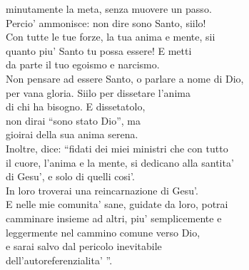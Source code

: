 \begin{haiku}
    minutamente la meta, senza muovere un passo.\\
    Percio' ammonisce: non dire sono Santo, siilo! \\
    Con tutte le tue forze, la tua anima e mente, sii \\
    quanto piu' Santo tu possa essere! E metti\\
    da parte il tuo egoismo e narcismo.\\
    Non pensare ad essere Santo, o parlare a nome di Dio,\\
    per vana gloria. Siilo per dissetare l'anima \\
    di chi ha bisogno. E dissetatolo, \\
    non dirai ``sono stato Dio'', ma \\
    gioirai della sua anima serena.\\
    Inoltre, dice: ``fidati dei miei ministri che con tutto\\
    il cuore, l'anima e la mente, si dedicano alla santita'\\
    di Gesu', e solo di quelli cosi'.\\
    In loro troverai una reincarnazione di Gesu'.\\
    E nelle mie comunita' sane, guidate da loro, potrai \\
    camminare insieme ad altri, piu' semplicemente e\\
    leggermente nel cammino comune verso Dio, \\
    e sarai salvo dal pericolo inevitabile\\
    dell'autoreferenzialita' ''.\\
\end{haiku}
